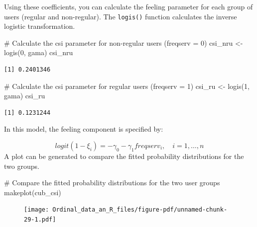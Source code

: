\documentclass[
  letterpaper,
  DIV=11,
  numbers=noendperiod]{scrartcl}
\newenvironment{Shaded}{\begin{snugshade}}{\end{snugshade}}
\newcommand{\CommentTok}[1]{\textcolor[rgb]{0.37,0.37,0.37}{#1}}
\newcommand{\DecValTok}[1]{\textcolor[rgb]{0.68,0.00,0.00}{#1}}
\newcommand{\FunctionTok}[1]{\textcolor[rgb]{0.28,0.35,0.67}{#1}}
\newcommand{\NormalTok}[1]{\textcolor[rgb]{0.00,0.23,0.31}{#1}}
\newcommand{\OtherTok}[1]{\textcolor[rgb]{0.00,0.23,0.31}{#1}}
\begin{document}
Using these coefficients, you can calculate the feeling parameter for
each group of users (regular and non-regular). The \texttt{logis()}
function calculates the inverse logistic transformation.

\begin{Shaded}
\begin{Highlighting}[]
\CommentTok{\# Calculate the csi parameter for non{-}regular users (freqserv = 0)}
\NormalTok{csi\_nru }\OtherTok{\textless{}{-}} \FunctionTok{logis}\NormalTok{(}\DecValTok{0}\NormalTok{, gama)}
\NormalTok{csi\_nru}
\end{Highlighting}
\end{Shaded}

\begin{verbatim}
[1] 0.2401346
\end{verbatim}

\begin{Shaded}
\begin{Highlighting}[]
\CommentTok{\# Calculate the csi parameter for regular users (freqserv = 1)}
\NormalTok{csi\_ru }\OtherTok{\textless{}{-}} \FunctionTok{logis}\NormalTok{(}\DecValTok{1}\NormalTok{, gama)}
\NormalTok{csi\_ru}
\end{Highlighting}
\end{Shaded}

\begin{verbatim}
[1] 0.1231244
\end{verbatim}

In this model, the feeling component is specified by:

\[
logit(1-\xi_i) = - \gamma_0 - \gamma_1 freqserv_i, \quad i = 1,\dots,n
\] A plot can be generated to compare the fitted probability
distributions for the two groups.

\begin{Shaded}
\begin{Highlighting}[]
\CommentTok{\# Compare the fitted probability distributions for the two user groups}
\FunctionTok{makeplot}\NormalTok{(cub\_csi)}
\end{Highlighting}
\end{Shaded}

\begin{figure}[H]

{\centering \texttt{[image: Ordinal\_data\_an\_R\_files/figure-pdf/unnamed-chunk-29-1.pdf]}

}

\end{figure}
\end{document}

